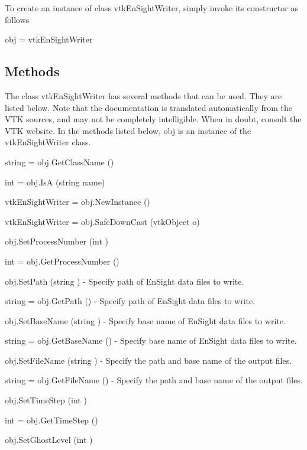 To create an instance of class vtk\-En\-Sight\-Writer, simply invoke its constructor as follows \begin{DoxyVerb}  obj = vtkEnSightWriter
\end{DoxyVerb}
 \hypertarget{vtkwidgets_vtkxyplotwidget_Methods}{}\subsection{Methods}\label{vtkwidgets_vtkxyplotwidget_Methods}
The class vtk\-En\-Sight\-Writer has several methods that can be used. They are listed below. Note that the documentation is translated automatically from the V\-T\-K sources, and may not be completely intelligible. When in doubt, consult the V\-T\-K website. In the methods listed below, {\ttfamily obj} is an instance of the vtk\-En\-Sight\-Writer class. 
\begin{DoxyItemize}
\item {\ttfamily string = obj.\-Get\-Class\-Name ()}  
\item {\ttfamily int = obj.\-Is\-A (string name)}  
\item {\ttfamily vtk\-En\-Sight\-Writer = obj.\-New\-Instance ()}  
\item {\ttfamily vtk\-En\-Sight\-Writer = obj.\-Safe\-Down\-Cast (vtk\-Object o)}  
\item {\ttfamily obj.\-Set\-Process\-Number (int )}  
\item {\ttfamily int = obj.\-Get\-Process\-Number ()}  
\item {\ttfamily obj.\-Set\-Path (string )} -\/ Specify path of En\-Sight data files to write.  
\item {\ttfamily string = obj.\-Get\-Path ()} -\/ Specify path of En\-Sight data files to write.  
\item {\ttfamily obj.\-Set\-Base\-Name (string )} -\/ Specify base name of En\-Sight data files to write.  
\item {\ttfamily string = obj.\-Get\-Base\-Name ()} -\/ Specify base name of En\-Sight data files to write.  
\item {\ttfamily obj.\-Set\-File\-Name (string )} -\/ Specify the path and base name of the output files.  
\item {\ttfamily string = obj.\-Get\-File\-Name ()} -\/ Specify the path and base name of the output files.  
\item {\ttfamily obj.\-Set\-Time\-Step (int )}  
\item {\ttfamily int = obj.\-Get\-Time\-Step ()}  
\item {\ttfamily obj.\-Set\-Ghost\-Level (int )}  

\end{DoxyItemize}
